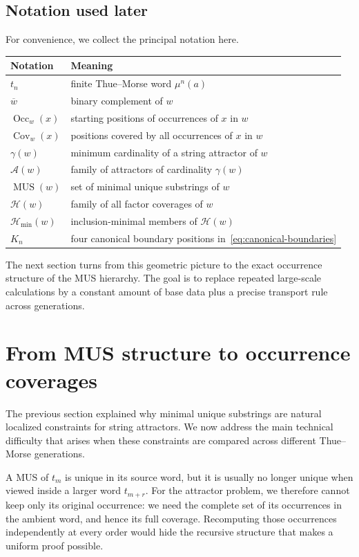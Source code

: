 \documentclass[11pt,a4paper]{article}
\theoremstyle{definition}\newtheorem{definition}[theorem]{Definition}
\theoremstyle{remark}\newtheorem{remark}[theorem]{Remark}
\newcommand{\Occ}{\operatorname{Occ}}
\newcommand{\Cov}{\operatorname{Cov}}
\newcommand{\MUS}{\operatorname{MUS}}
\newcommand{\Acal}{\mathcal{A}}
\newcommand{\Hmin}{\mathcal{H}_{\min}}
\begin{document}
\subsection{Notation used later}
For convenience, we collect the principal notation here.
\begin{center}
\begin{tabular}{@{}ll@{}}
\toprule
Notation & Meaning \\
\midrule
$t_n$ & finite Thue--Morse word $\mu^n(a)$ \\
$\overline{w}$ & binary complement of $w$ \\
$\Occ_w(x)$ & starting positions of occurrences of $x$ in $w$ \\
$\Cov_w(x)$ & positions covered by all occurrences of $x$ in $w$ \\
$\gamma(w)$ & minimum cardinality of a string attractor of $w$ \\
$\Acal(w)$ & family of attractors of cardinality $\gamma(w)$ \\
$\MUS(w)$ & set of minimal unique substrings of $w$ \\
$\mathcal H(w)$ & family of all factor coverages of $w$ \\
$\Hmin(w)$ & inclusion-minimal members of $\mathcal H(w)$ \\
$K_n$ & four canonical boundary positions in~\eqref{eq:canonical-boundaries} \\
\bottomrule
\end{tabular}
\end{center}

The next section turns from this geometric picture to the exact occurrence structure of the MUS hierarchy. The goal is to replace repeated large-scale calculations by a constant amount of base data plus a precise transport rule across generations.



\section{From MUS structure to occurrence coverages}
\label{sec:mus-transport}

The previous section explained why minimal unique substrings are natural localized constraints for string attractors. We now address the main technical difficulty that arises when these constraints are compared across different Thue--Morse generations.

A MUS of $t_m$ is unique in its source word, but it is usually no longer unique when viewed inside a larger word $t_{m+r}$. For the attractor problem, we therefore cannot keep only its original occurrence: we need the complete set of its occurrences in the ambient word, and hence its full coverage. Recomputing those occurrences independently at every order would hide the recursive structure that makes a uniform proof possible.
\end{document}
